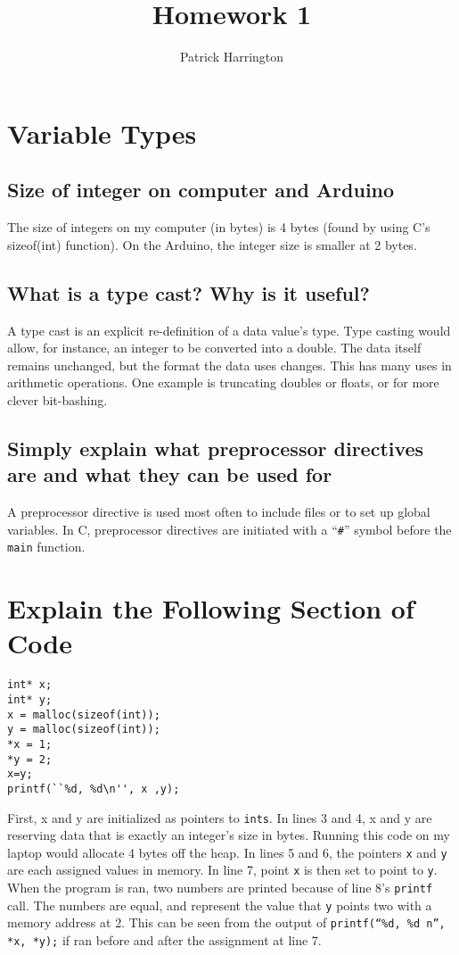 \documentclass{hw}
\title{Homework 1}
\author{Patrick Harrington}
\begin{document}
\maketitle
\section{Variable Types}
\subsection{Size of integer on computer and Arduino}
The size of integers on my computer (in bytes) is 4 bytes (found by using C's
sizeof(int) function). On the Arduino, the integer size is smaller at 2 bytes.
\subsection{What is a type cast? Why is it useful?}
A type cast is an explicit re-definition of a data value's type. Type casting
would allow, for instance, an integer to be converted into a double. The data
itself remains unchanged, but the format the data uses changes. This has
many uses in arithmetic operations. One example is truncating doubles or
floats, or for more clever bit-bashing.
\subsection{Simply explain what preprocessor directives are and what they can
be used for}
A preprocessor directive is used most often to include files or to set up
global variables. In C, preprocessor directives are initiated with a
``\texttt{\#}''
symbol before the \texttt{main} function.
\section{Explain the Following Section of Code}
\begin{lstlisting}
int* x;
int* y;
x = malloc(sizeof(int));
y = malloc(sizeof(int));
*x = 1;
*y = 2;
x=y;
printf(``%d, %d\n'', x ,y);
\end{lstlisting}

First, x and y are initialized as pointers to \texttt{ints}. In lines 3 and 4,
x and y are reserving data that is exactly an integer's size in bytes. Running
this code on my laptop would allocate 4 bytes off the heap. In lines 5 and 6,
the pointers \texttt{x} and \texttt{y} are each assigned values in memory. In
line 7, point \texttt{x} is then set to point to \texttt{y}. When the program
is ran, two numbers are printed because of line 8's \texttt{printf} call. The
numbers are equal, and represent the value that \texttt{y} points two
with a memory address at 2. This can be seen from the output of
\texttt{printf(``\%d, \%d\\n'', *x, *y);} if ran before and after the
assignment at line 7.
\end{document}

